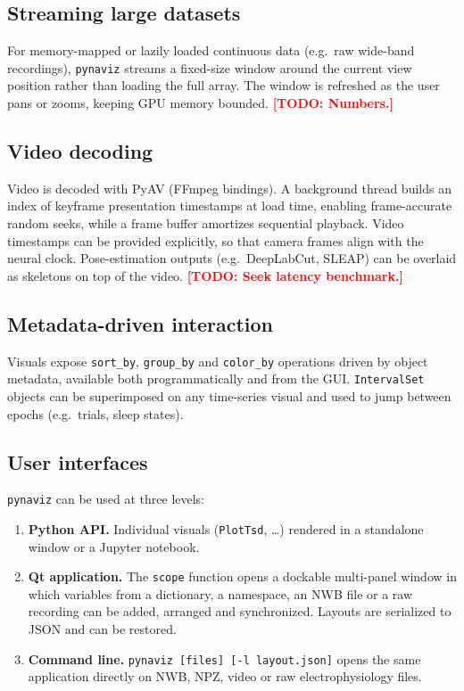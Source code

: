 \documentclass[11pt]{article}
\newcommand{\todo}[1]{\textcolor{red}{\textbf{[TODO: #1]}}}
\newcommand{\pynaviz}{\texttt{pynaviz}}
\begin{document}
\subsection{Streaming large datasets}
For memory-mapped or lazily loaded continuous data (e.g.\ raw wide-band
recordings), \pynaviz{} streams a fixed-size window around the current view
position rather than loading the full array. The window is refreshed as the
user pans or zooms, keeping GPU memory bounded. \todo{Numbers.}

\subsection{Video decoding}
Video is decoded with PyAV (FFmpeg bindings). A background thread builds an
index of keyframe presentation timestamps at load time, enabling
frame-accurate random seeks, while a frame buffer amortizes sequential
playback. Video timestamps can be provided explicitly, so that
camera frames align with the neural clock. Pose-estimation outputs (e.g.\
DeepLabCut, SLEAP) can be overlaid as skeletons on top of the video.
\todo{Seek latency benchmark.}

\subsection{Metadata-driven interaction}
Visuals expose \texttt{sort\_by}, \texttt{group\_by} and \texttt{color\_by}
operations driven by object metadata, available both programmatically and
from the GUI. \texttt{IntervalSet} objects can be superimposed on any
time-series visual and used to jump between epochs (e.g.\ trials, sleep
states).

\subsection{User interfaces}
\pynaviz{} can be used at three levels:
\begin{enumerate}
  \item \textbf{Python API.} Individual visuals (\texttt{PlotTsd}, \ldots)
        rendered in a standalone window or a Jupyter notebook.
  \item \textbf{Qt application.} The \texttt{scope} function opens a
        dockable multi-panel window in which variables from a dictionary, a
        namespace, an NWB file or a raw recording can be added, arranged and
        synchronized. Layouts are serialized to JSON and can be restored.
  \item \textbf{Command line.} \texttt{pynaviz [files] [-l layout.json]}
        opens the same application directly on NWB, NPZ, video or raw
        electrophysiology files.
\end{enumerate}
\end{document}
